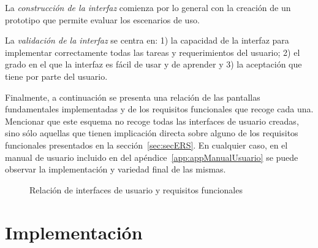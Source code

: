 La \emph{construcción de la interfaz} comienza por lo general con la creación de un prototipo que
permite evaluar los escenarios de uso.

La \emph{validación de la interfaz} se centra en: 1) la capacidad de la interfaz para implementar
correctamente todas las tareas y requerimientos del usuario; 2) el grado en el que la interfaz es fácil de usar y de aprender y 3) la aceptación que tiene por parte del usuario.

Finalmente, a continuación se presenta una relación de las pantallas fundamentales implementadas y de los requisitos funcionales que recoge cada una. Mencionar que este esquema no recoge todas las interfaces de usuario creadas, sino sólo aquellas que tienen implicación directa sobre alguno de los requisitos funcionales presentados en la sección~\ref{sec:secERS}. En cualquier caso, en el manual de usuario incluido en del apéndice~\ref{app:appManualUsuario} se puede observar la implementación y variedad final de las mismas.

\begin{figure} [!htb]
	\centering
	\caption{Relación de interfaces de usuario y requisitos funcionales}
	\label{fig:guiYrf}
\end{figure}



\FloatBarrier
\section{Implementación}
\label{sec:secModeloImp}

